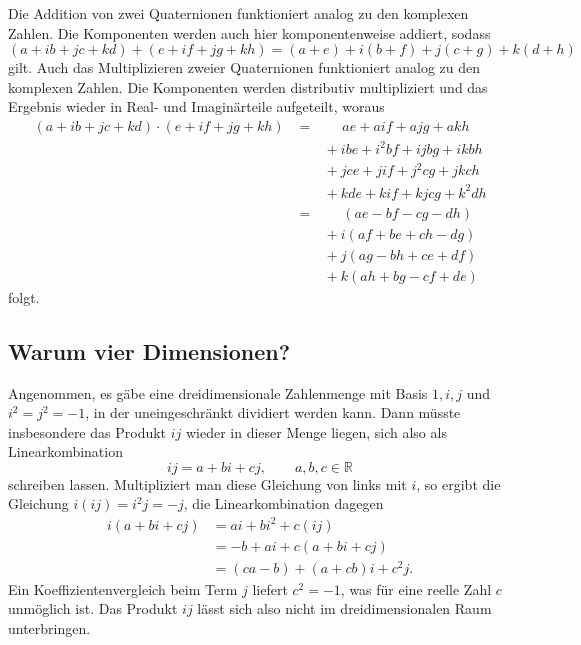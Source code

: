 Die Addition von zwei Quaternionen funktioniert analog zu den 
komplexen Zahlen.
%
Die Komponenten werden auch hier komponentenweise
addiert, sodass
\begin{equation*}
    (a + ib + jc + kd) + (e + if + jg + kh) 
    = (a+e) + i(b+f) + j(c+g) + k(d+h)
\end{equation*}
gilt.
Auch das Multiplizieren zweier Quaternionen funktioniert analog zu 
den komplexen Zahlen. Die Komponenten werden distributiv
%
multipliziert und das Ergebnis wieder in Real- und Imaginärteile
aufgeteilt, woraus
\begin{align*}
    (a + ib + jc + kd) \cdot (e + if + jg + kh) 
    &= \qquad ae + aif + ajg + akh \\
    &\qquad+ ibe + i^2bf + i\!jbg + ikbh \\
    &\qquad+ jce + jif + j^2cg + jkch \\
    &\qquad+ kde + kif + kjcg + k^2dh \\
    &= \qquad (ae - bf - cg - dh) \\
    &\qquad+ i(af + be + ch - dg) \\
    &\qquad+ j(ag - bh + ce + df) \\
    &\qquad+ k(ah + bg - cf + de)
\end{align*}
folgt.

\subsection{Warum vier Dimensionen?}
Angenommen, es gäbe eine dreidimensionale Zahlenmenge mit Basis $1, i, j$ und
$i^2 = j^2 = -1$, in der uneingeschränkt dividiert werden kann. Dann
müsste insbesondere das Produkt $i\!j$ wieder in dieser Menge liegen,
sich also als Linearkombination
\begin{equation*}
    i\!j = a + bi + cj, \qquad a,b,c \in \mathbb{R}
\end{equation*}
schreiben lassen. Multipliziert man diese Gleichung von links mit $i$,
so ergibt die Gleichung $i(i\!j) = i^2 j = -j$, die Linearkombination
dagegen
\begin{align*}
    i(a + bi + cj) &= ai + bi^2 + c(i\!j) \\
                   &= -b + ai + c(a + bi + cj) \\
                   &= (ca - b) + (a + cb)i + c^2\!j .
\end{align*}
Ein Koeffizientenvergleich beim Term $j$ liefert $c^2 = -1$, was für
eine reelle Zahl $c$ unmöglich ist. Das Produkt $i\!j$ lässt sich also
nicht im dreidimensionalen Raum unterbringen.

